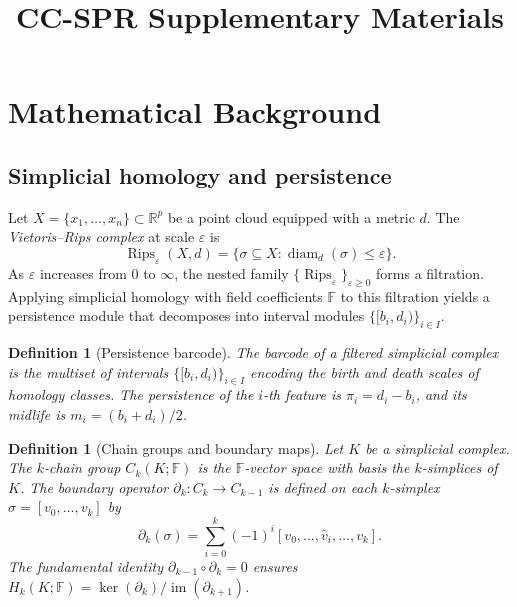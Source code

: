 \documentclass[11pt]{article}
\title{CC-SPR Supplementary Materials}
\author{}
\date{}
\newtheorem{definition}[theorem]{Definition}
\DeclareMathOperator{\Rips}{Rips}
\DeclareMathOperator{\diam}{diam}
\begin{document}
\maketitle

\tableofcontents
\newpage

\section{Mathematical Background}
\label{sec:supp_background}

\subsection{Simplicial homology and persistence}

Let $X = \{x_1, \ldots, x_n\} \subset \mathbb{R}^p$ be a point cloud equipped with a metric $d$.
The \emph{Vietoris--Rips complex} at scale $\varepsilon$ is
\[
\Rips_\varepsilon(X, d) = \bigl\{ \sigma \subseteq X : \diam_d(\sigma) \le \varepsilon \bigr\}.
\]
As $\varepsilon$ increases from $0$ to $\infty$, the nested family $\{\Rips_\varepsilon\}_{\varepsilon \ge 0}$ forms a filtration.
Applying simplicial homology with field coefficients $\mathbb{F}$ to this filtration yields a persistence module that decomposes into interval modules $\{[b_i, d_i)\}_{i \in I}$.

\begin{definition}[Persistence barcode]\label{def:barcode}
The \emph{barcode} of a filtered simplicial complex is the multiset of intervals $\{[b_i, d_i)\}_{i \in I}$ encoding the birth and death scales of homology classes.
The \emph{persistence} of the $i$-th feature is $\pi_i = d_i - b_i$, and its \emph{midlife} is $m_i = (b_i + d_i)/2$.
\end{definition}

\begin{definition}[Chain groups and boundary maps]\label{def:chains}
Let $K$ be a simplicial complex.
The \emph{$k$-chain group} $C_k(K; \mathbb{F})$ is the $\mathbb{F}$-vector space with basis the $k$-simplices of $K$.
The \emph{boundary operator} $\partial_k: C_k \to C_{k-1}$ is defined on each $k$-simplex $\sigma = [v_0, \ldots, v_k]$ by
\[
\partial_k(\sigma) = \sum_{i=0}^k (-1)^i [v_0, \ldots, \hat{v}_i, \ldots, v_k].
\]
The fundamental identity $\partial_{k-1} \circ \partial_k = 0$ ensures $H_k(K; \mathbb{F}) = \ker(\partial_k) / \operatorname{im}(\partial_{k+1})$.
\end{definition}
\end{document}
